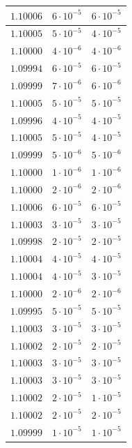 \begin{table}[h]
\begin{tabular}{|c|c|c|}
       \hline
       $1.10006$ & $6 \cdot 10^{-5}$ & $6 \cdot 10^{-5}$ \\
       \hline
       $1.10005$ & $5 \cdot 10^{-5}$ & $4 \cdot 10^{-5}$ \\
       \hline
       $1.10000$ & $4 \cdot 10^{-6}$ & $4 \cdot 10^{-6}$ \\
       \hline
       $1.09994$ & $6 \cdot 10^{-5}$ & $6 \cdot 10^{-5}$ \\
       \hline
       $1.09999$ & $7 \cdot 10^{-6}$ & $6 \cdot 10^{-6}$ \\
       \hline
       $1.10005$ & $5 \cdot 10^{-5}$ & $5 \cdot 10^{-5}$ \\
       \hline
       $1.09996$ & $4 \cdot 10^{-5}$ & $4 \cdot 10^{-5}$ \\
       \hline
       $1.10005$ & $5 \cdot 10^{-5}$ & $4 \cdot 10^{-5}$ \\
       \hline
       $1.09999$ & $5 \cdot 10^{-6}$ & $5 \cdot 10^{-6}$ \\
       \hline
       $1.10000$ & $1 \cdot 10^{-6}$ & $1 \cdot 10^{-6}$ \\
       \hline
       $1.10000$ & $2 \cdot 10^{-6}$ & $2 \cdot 10^{-6}$ \\
       \hline
       $1.10006$ & $6 \cdot 10^{-5}$ & $6 \cdot 10^{-5}$ \\
       \hline
       $1.10003$ & $3 \cdot 10^{-5}$ & $3 \cdot 10^{-5}$ \\
       \hline
       $1.09998$ & $2 \cdot 10^{-5}$ & $2 \cdot 10^{-5}$ \\
       \hline
       $1.10004$ & $4 \cdot 10^{-5}$ & $4 \cdot 10^{-5}$ \\
       \hline
       $1.10004$ & $4 \cdot 10^{-5}$ & $3 \cdot 10^{-5}$ \\
       \hline
       $1.10000$ & $2 \cdot 10^{-6}$ & $2 \cdot 10^{-6}$ \\
       \hline
       $1.09995$ & $5 \cdot 10^{-5}$ & $5 \cdot 10^{-5}$ \\
       \hline
       $1.10003$ & $3 \cdot 10^{-5}$ & $3 \cdot 10^{-5}$ \\
       \hline
       $1.10002$ & $2 \cdot 10^{-5}$ & $2 \cdot 10^{-5}$ \\
       \hline
       $1.10003$ & $3 \cdot 10^{-5}$ & $3 \cdot 10^{-5}$ \\
       \hline
       $1.10003$ & $3 \cdot 10^{-5}$ & $3 \cdot 10^{-5}$ \\
       \hline
       $1.10002$ & $2 \cdot 10^{-5}$ & $1 \cdot 10^{-5}$ \\
       \hline
       $1.10002$ & $2 \cdot 10^{-5}$ & $2 \cdot 10^{-5}$ \\
       \hline
       $1.09999$ & $1 \cdot 10^{-5}$ & $1 \cdot 10^{-5}$ \\
       \hline
   \end{tabular}
\end{table}


